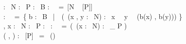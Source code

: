 \begin{figure}
\def\removetwofn#1#2{{#2 \setminus \{#1\}}}%
\def\addtwofn#1#2{{\{#1\} \cup #2}}%
\def\emptysetoneid#1{{\emptyset_#1}}%
\def\singletononefn#1{{\{ #1 \}}}%
\def\uniontwofn#1#2{{#1 \cup #2}}%
\def\differencetwofn#1#2{{#1 \setminus #2}}%
\setlength{\fboxsep}{1pt} 
\def\membertwofn#1#2{{#1 \in #2}}%
\setlength{\fboxsep}{1pt} 
 \begin{program} 
  :\mbox{ }  \pvsnewline{}
\zi\zi {} \pvsnewline{}
 \pvsnewline{}
 N :\mbox{ }  \pvsnewline{}
 \pvsnewline{}
 P :\mbox{ }  \pvsnewline{}
 \pvsnewline{}
 B :\mbox{ }  \mbox{ }=\mbox{ }[\ii N \rightarrow\mbox{ } [\ii P]] \pvsnewline{}
\\[-\baselineskip]\oo\oo\zi\zi\zi\zo\zo\zo \pvsnewline{}
  :\mbox{ }  \mbox{ }=\mbox{ }\ii \{ b :\mbox{ } B \mbox{ }|\mbox{ }\mbox{ }(\ii \forall\mbox{ }(\ii x , y :\mbox{ } N) :\mbox{ } x \mbox{ }\neq\mbox{ }\ii y \mbox{ }\Rightarrow\mbox{ }\ii {}(\ii b(\ii x) , b(\ii y))) \} \pvsnewline{}
\\[-\baselineskip]\oo\oo\oo\oo\oo\oo\oo\oo\zi\zi\zi\zi\zi\zi\zi\zo\zo\zo\zo\zo\zo\zo \pvsnewline{}
  , x :\mbox{ }  N \pvsnewline{}
 \pvsnewline{}
  :\mbox{ }  P \pvsnewline{}
 \pvsnewline{}
  :\mbox{ }   \pvsnewline{}
 \pvsnewline{}
  :\mbox{ }  \mbox{ }=\mbox{ }(\ii \lambda\mbox{ }(\ii x :\mbox{ } N) :\mbox{ } \emptysetoneid { P }) \pvsnewline{}
\\[-\baselineskip]\oo\oo\zi\zo \pvsnewline{}
 (\ii {} , ) :\mbox{ } [\ii P] \mbox{ }=\mbox{ } (\ii {}) \pvsnewline{}
\\[-\baselineskip]\oo\oo\oo\zi\zi\zo\zo \pvsnewline{}

\end{program}
\end{figure}
